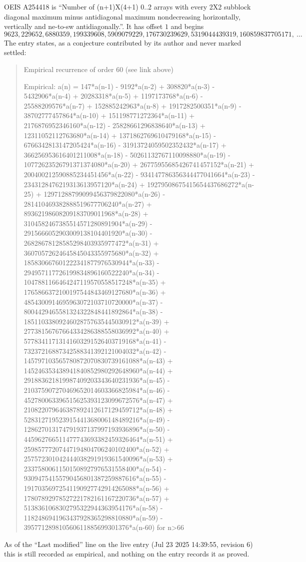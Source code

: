 \documentclass[11pt,a4paper]{article}
\theoremstyle{plain}
\theoremstyle{definition}
\begin{document}
OEIS A254418 is ``Number of (n+1)X(4+1) 0..2 arrays with every 2X2 subblock diagonal maximum minus antidiagonal maximum nondecreasing horizontally, vertically and ne-to-sw antidiagonally.''. It has offset $1$ and begins
\[
9623, 229652, 6880359, 199339608, 5909079229, 176730239629, 5319044439319, 160859837705171,\ \dots
\]
The entry states, as a conjecture contributed by its author and never marked settled:
\begin{quote}
Empirical recurrence of order 60 (see link above)

Empirical: a(n) = 147*a(n-1) - 9192*a(n-2) + 308820*a(n-3) - 5432906*a(n-4) + 20283318*a(n-5) + 1197173768*a(n-6) - 25588209576*a(n-7) + 152885242963*a(n-8) + 1917282500351*a(n-9) - 38702777457864*a(n-10) + 151198771272364*a(n-11) + 2176876952346160*a(n-12) - 25828661296838640*a(n-13) + 12311052112763680*a(n-14) + 1371862769610479168*a(n-15) - 6766342813147205424*a(n-16) - 31913724059502352432*a(n-17) + 366256953616401211008*a(n-18) - 50261132767110098880*a(n-19) - 10772623526791371374080*a(n-20) + 26775955685426741457152*a(n-21) + 200400212590885234451456*a(n-22) - 934147786356344477041664*a(n-23) - 2343128476219313613957120*a(n-24) + 19279508675415654437686272*a(n-25) + 12971288799099456379822080*a(n-26) - 281410469382888519677706240*a(n-27) + 89362198608209183709011968*a(n-28) + 3104582467385514571280891904*a(n-29) - 2915666052903009138104401920*a(n-30) - 26828678128585298403935977472*a(n-31) + 36070572624645845043355975680*a(n-32) + 185830667601222341877976530944*a(n-33) - 294957117726199834896160522240*a(n-34) - 1047881166464247119570558517248*a(n-35) + 1765866372100197544843469127680*a(n-36) + 4854300914695963072103710720000*a(n-37) - 8004429465581324322848441892864*a(n-38) - 18511033809246028757635445030912*a(n-39) + 27738156767664334286388558036992*a(n-40) + 57783411713141603291526403719168*a(n-41) - 73237216887342588341392121004032*a(n-42) - 145797103565780872070830739161088*a(n-43) + 145246353438941840852980292648960*a(n-44) + 291883621819987409203343640231936*a(n-45) - 210375907270469652014603366825984*a(n-46) - 452780063396515625393123099672576*a(n-47) + 210822079646387892412617129459712*a(n-48) + 528312719523915441368006148489216*a(n-49) - 128627013174791937137997193936896*a(n-50) - 445962766511477743693382459326464*a(n-51) + 25985777207447194804706240102400*a(n-52) + 257572301042444038291919361540096*a(n-53) + 23375800611501508927976531558400*a(n-54) - 93094754155790456801387259887616*a(n-55) - 19170356972541190927742914265088*a(n-56) + 17807892978527221782161167220736*a(n-57) + 5138361068302795322944363954176*a(n-58) - 1182486941963437928365298810880*a(n-59) - 395771289810560611885699301376*a(n-60) for n>66
\end{quote}
As of the ``Last modified'' line on the live entry (Jul 23 2025 14:39:55, revision 6) this is still
recorded as empirical, and nothing on the entry records it as proved.
\end{document}
